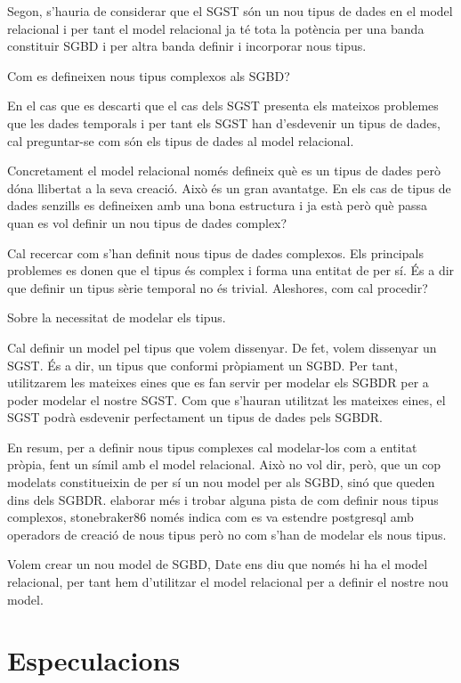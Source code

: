 Segon, s'hauria de considerar que el SGST són un nou tipus de dades en el model relacional i per tant el model relacional ja té tota la potència per una banda constituir SGBD i per altra banda definir i incorporar nous tipus.


Com es defineixen nous tipus complexos als SGBD?

En el cas que es descarti que el cas dels SGST presenta els mateixos problemes que les dades temporals i per tant els SGST han d'esdevenir un tipus de dades, cal preguntar-se com són els tipus de dades al model relacional.

Concretament el model relacional només defineix què es un tipus de dades però dóna llibertat a la seva creació. Això és un gran avantatge. En els cas de tipus de dades senzills es defineixen amb una bona estructura i ja està però què passa quan es vol definir un nou tipus de dades complex?

Cal recercar com s'han definit nous tipus de dades complexos. Els principals problemes es donen que el tipus és complex i forma una entitat de per sí. És a dir que definir un tipus sèrie temporal no és trivial. Aleshores, com cal procedir?



Sobre la necessitat de modelar els tipus.

Cal definir un model pel tipus que volem dissenyar.
De fet, volem dissenyar un SGST. És a dir, un tipus que conformi pròpiament un SGBD. Per tant, utilitzarem les mateixes eines que es fan servir per modelar els SGBDR per a poder modelar el nostre SGST. Com que s'hauran utilitzat les mateixes eines, el SGST podrà esdevenir perfectament un tipus de dades pels SGBDR.

En resum, per a definir nous tipus complexes cal modelar-los com a entitat pròpia, fent un símil amb el model relacional. Això no vol dir, però, que un cop modelats constitueixin de per sí un nou model per als SGBD, sinó que queden dins dels SGBDR.  elaborar més i trobar alguna pista de com definir nous tipus complexos, stonebraker86 només indica com es va estendre postgresql amb operadors de creació de nous tipus però no com s'han de modelar els nous tipus.

Volem crear un nou model de SGBD, Date ens diu que només hi ha el model relacional, per tant hem d'utilitzar el model relacional per a definir el nostre nou model.



\section{Especulacions}

